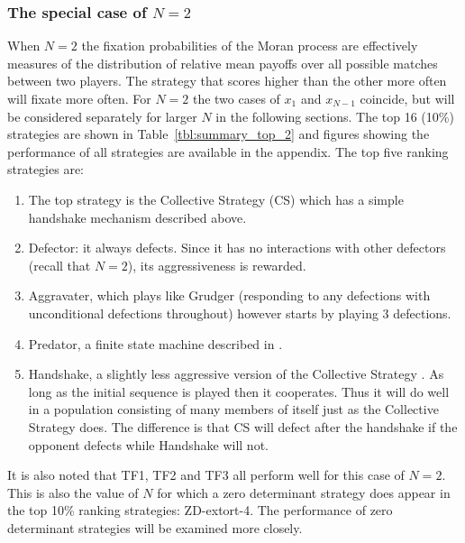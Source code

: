 \documentclass[10pt,letterpaper]{article}
\begin{document}
\subsubsection*{The special case of \(N=2\)}

When $N=2$ the fixation probabilities of the Moran process are effectively
measures of the distribution of  relative mean payoffs over all possible matches
between two players. The strategy that scores higher than the other more often
will fixate more often. For \(N=2\) the two cases of \(x_1\) and \(x_{N-1}\)
coincide, but will be considered separately for larger \(N\) in the following
sections. The top 16 (10\%) strategies are shown in
Table~\ref{tbl:summary_top_2} and figures showing the performance of all
strategies are available in the appendix. The top five ranking strategies are:

\begin{enumerate}
    \item The top strategy is the Collective Strategy (CS) which has a simple
        handshake mechanism described above.
    \item Defector: it always defects. Since it has no interactions with other
        defectors (recall that \(N=2\)), its aggressiveness is rewarded.
    \item Aggravater, which plays like Grudger (responding to any
        defections with unconditional defections throughout) however starts by
        playing 3 defections.
    \item Predator, a finite state machine described in \cite{Ashlock2006}.
    \item Handshake, a slightly less aggressive version of the Collective
        Strategy \cite{Robson1990}. As long as the initial sequence is played
        then it cooperates. Thus it will do well in a population consisting of
        many members of itself just as the Collective Strategy does. The
        difference is that CS will defect after the handshake if the opponent
        defects while Handshake will not.
\end{enumerate}

It is also noted that TF1, TF2 and TF3 all perform well for this case of
\(N=2\). This is also the value of \(N\) for which a zero determinant strategy
does appear in the top 10\% ranking strategies: ZD-extort-4. The performance of
zero determinant strategies will be examined more closely.
\end{document}
